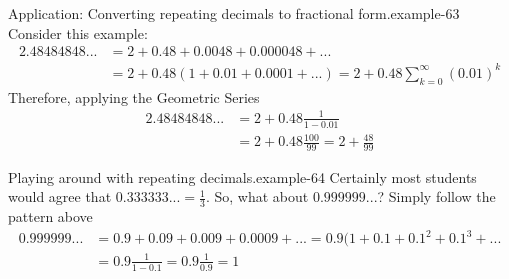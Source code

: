 \documentclass[10pt,]{book}
\numberwithin{equation}{section}
\begin{document}
\begin{example}{Application: Converting repeating decimals to fractional form.}{example-63}%
\hypertarget{p-1542}{}%
Consider this example:%
%
\begin{align*}
2.48484848... & = 2 + 0.48 + 0.0048 + 0.000048 + ...\\
&  = 2 + 0.48(1 + 0.01 + 0.0001 + ... ) = 2 + 0.48 \sum_{k=0}^\infty (0.01)^k
\end{align*}
\hypertarget{p-1543}{}%
Therefore, applying the Geometric Series%
%
\begin{align*}
2.48484848... & = 2 + 0.48 \frac{1}{1-0.01} \\
& = 2 + 0.48 \frac{100}{99} = 2 + \frac{48}{99} 
\end{align*}
\end{example}
\begin{example}{Playing around with repeating decimals.}{example-64}%
\hypertarget{p-1544}{}%
Certainly most students would agree that \(0.333333... = \frac{1}{3} \). So, what about \(0.999999...\)? Simply follow the pattern above%
%
\begin{align*}
0.999999... & = 0.9 + 0.09 + 0.009 + 0.0009 + ... = 0.9(1 + 0.1 + 0.1^2 + 0.1^3 + ...\\
& = 0.9 \frac{1}{1-0.1} = 0.9 \frac{1}{0.9} = 1 
\end{align*}
\end{example}
%
%
\typeout{************************************************}
\typeout{************************************************}
%
\end{document}
